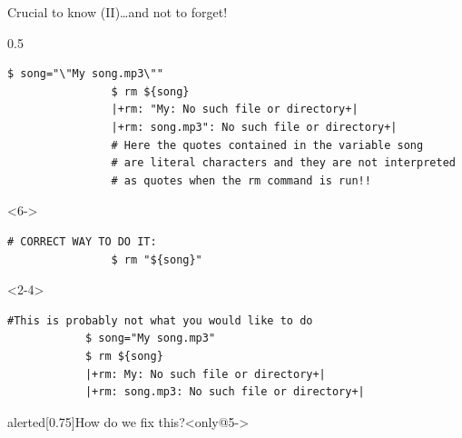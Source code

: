 \begin{frame}[fragile]{Crucial to know (II)}{\ldots{}and not to forget!}
\begin{overlayarea}{\textwidth}{0.5\textheight}
\begin{onlyenv}
\begin{lstlisting}[style=MyBash, aboveskip=2mm]
                $ song="\"My song.mp3\""
                $ rm ${song}
                |+rm: "My: No such file or directory+|
                |+rm: song.mp3": No such file or directory+|
                # Here the quotes contained in the variable song
                # are literal characters and they are not interpreted
                # as quotes when the rm command is run!!
            \end{lstlisting}
        \end{onlyenv}
        \begin{onlyenv}<6->
            \begin{lstlisting}[style=MyBash, firstnumber=9]
                # CORRECT WAY TO DO IT:
                $ rm "${song}"
            \end{lstlisting}
        \end{onlyenv}
    \end{overlayarea}
    \begin{onlyenv}<2-4>
        \begin{lstlisting}[style=MyBash]
            #This is probably not what you would like to do
            $ song="My song.mp3"
            $ rm ${song}
            |+rm: My: No such file or directory+|
            |+rm: song.mp3: No such file or directory+|
        \end{lstlisting}
    \end{onlyenv}
    \vspace{6mm}
    \begin{varblock}{alerted}[0.75\textwidth]{How do we fix this?}<only@5->
    \end{varblock}
\end{frame}
